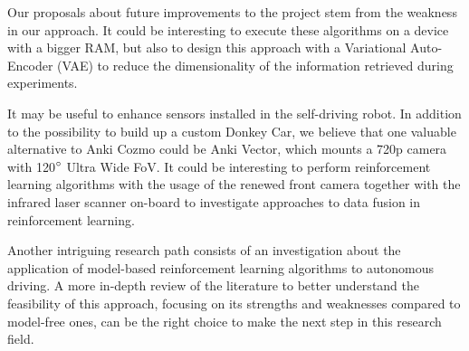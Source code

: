 \documentclass[10pt,twocolumn,letterpaper]{article}
\begin{document}
Our proposals about future improvements to the project stem from the weakness in our approach.
It could be interesting to execute these algorithms on a device with a bigger RAM, but also to design this approach with a Variational Auto-Encoder (VAE) to reduce the dimensionality of the information retrieved during experiments.

It may be useful to enhance sensors installed in the self-driving robot.
In addition to the possibility to build up a custom Donkey Car, we believe that one valuable alternative to Anki Cozmo could be Anki Vector, which mounts a 720p camera with 120$\degree$ Ultra Wide FoV.
It could be interesting to perform reinforcement learning algorithms with the usage of the renewed front camera together with the infrared laser scanner on-board to investigate approaches to data fusion in reinforcement learning.

Another intriguing research path consists of an investigation about the application of model-based reinforcement learning algorithms to autonomous driving.
A more in-depth review of the literature to better understand the feasibility of this approach, focusing on its strengths and weaknesses compared to model-free ones, can be the right choice to make the next step in this research field.

    {\footnotesize
        
        
    }
\end{document}
